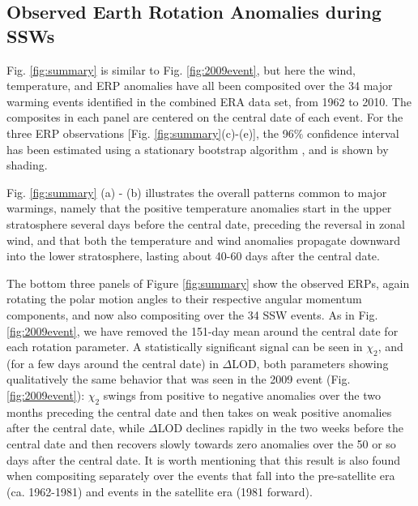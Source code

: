 \documentclass[draft,jgrga]{agutex}
\begin{document}
\begin{article}
\section{Observed Earth Rotation Anomalies during SSWs}
\label{sec:obs}

Fig. \ref{fig:summary} is similar to Fig. \ref{fig:2009event}, but here the wind, temperature, and ERP anomalies have all been composited over the 34 major warming events identified in the combined ERA data set, from 1962 to 2010.
The composites in each panel are centered on the central date of each event.
For the three ERP observations [Fig. \ref{fig:summary}(c)-(e)], the 96$\%$ confidence interval has been estimated  using a stationary bootstrap algorithm \citep{wilks1995}, and is shown by shading.

Fig. \ref{fig:summary} (a) - (b)  { illustrates the overall patterns common to major warmings, namely that the positive temperature anomalies  start in the upper stratosphere several days before the central date, preceding the reversal in zonal wind, and that both the temperature and  wind anomalies propagate downward into the lower
stratosphere, lasting about 40-60 days after the central date.}


The bottom  {three panels} of Figure \ref{fig:summary} show the observed ERPs,  {again rotating the polar motion angles to their respective angular momentum components, and now also compositing  over the 34 SSW events.}
 {As in Fig.} \ref{fig:2009event},  {we have removed the 151-day mean around the central date for each rotation parameter.}
A statistically significant signal can be seen in $\chi_2$, and  {(for a few days around the central date)} in $\Delta$LOD, both parameters showing qualitatively the same behavior that was seen in the 2009 event (Fig. \ref{fig:2009event}): $\chi_2$ swings from positive to negative anomalies over the two months preceding the central date and then takes on weak positive anomalies after the central date, while $\Delta$LOD declines rapidly in the two weeks before the central date and then recovers slowly towards zero anomalies over the 50 or so days after the central date.
 {It is worth mentioning that this result is also found when compositing separately over the events that fall into the pre-satellite era (ca. 1962-1981) and events in the satellite era (1981 forward).  }


\end{article}
\end{document}
